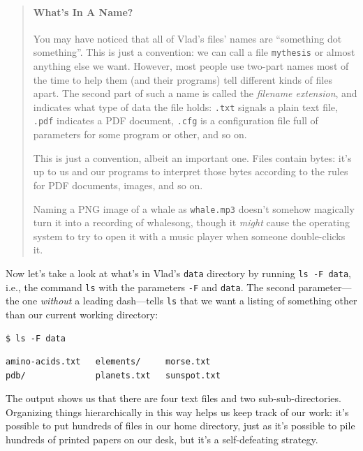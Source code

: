 \documentclass[]{book}
\newcommand{\gdef}[2]{\emph{#2}}
\begin{document}
\begin{quote}
\mbox{}\paragraph{What's In A Name?}

You may have noticed that all of Vlad's files' names are ``something dot
something''. This is just a convention: we can call a file
\texttt{mythesis} or almost anything else we want. However, most people
use two-part names most of the time to help them (and their programs)
tell different kinds of files apart. The second part of such a name is
called the \gdef{g:filename-extension}{filename extension}, and
indicates what type of data the file holds: \texttt{.txt} signals a
plain text file, \texttt{.pdf} indicates a PDF document, \texttt{.cfg}
is a configuration file full of parameters for some program or other,
and so on.

This is just a convention, albeit an important one. Files contain bytes:
it's up to us and our programs to interpret those bytes according to the
rules for PDF documents, images, and so on.

Naming a PNG image of a whale as \texttt{whale.mp3} doesn't somehow
magically turn it into a recording of whalesong, though it \emph{might}
cause the operating system to try to open it with a music player when
someone double-clicks it.
\end{quote}

Now let's take a look at what's in Vlad's \texttt{data} directory by
running \texttt{ls -F data}, i.e., the command \texttt{ls} with the
parameters \texttt{-F} and \texttt{data}. The second parameter---the one
\emph{without} a leading dash---tells \texttt{ls} that we want a listing
of something other than our current working directory:

\begin{verbatim}
$ ls -F data
\end{verbatim}

\begin{verbatim}
amino-acids.txt   elements/     morse.txt
pdb/              planets.txt   sunspot.txt
\end{verbatim}

The output shows us that there are four text files and two
sub-sub-directories. Organizing things hierarchically in this way helps
us keep track of our work: it's possible to put hundreds of files in our
home directory, just as it's possible to pile hundreds of printed papers
on our desk, but it's a self-defeating strategy.
\end{document}
